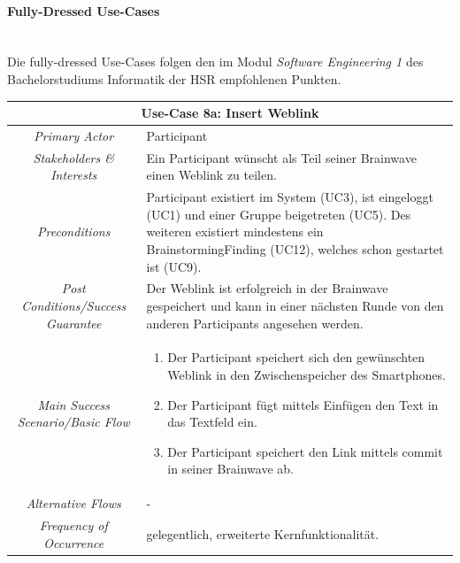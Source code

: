 \paragraph{Fully-Dressed Use-Cases}
\label{par:fully-dressed-uc}~\\
Die fully-dressed Use-Cases folgen den im Modul \textit{Software Engineering 1} des Bachelorstudiums Informatik der HSR empfohlenen Punkten.
\renewcommand{\arraystretch}{1.35}
\begin{center}
	\begin{longtable}{| c | p{7cm} |}
		\hline
		\multicolumn{2}{|c|}{\textbf{Use-Case 8a: Insert Weblink}}\\
		\hline\hline
		\textit{Primary Actor} & Participant\\
		\hline
		\textit{Stakeholders \& Interests} & Ein Participant wünscht als Teil seiner Brainwave einen Weblink zu teilen. \\
		\hline
		\textit{Preconditions} & Participant existiert im System (UC3), ist eingeloggt (UC1) und einer Gruppe beigetreten (UC5). Des weiteren existiert mindestens ein BrainstormingFinding (UC12), welches schon gestartet ist (UC9).\\
		\hline
		\textit{Post Conditions/Success Guarantee} & Der Weblink ist erfolgreich in der Brainwave gespeichert und kann in einer nächsten Runde von den anderen Participants angesehen werden.\\
		\hline
		\textit{Main Success Scenario/Basic Flow} & 
		\begin{enumerate}[noitemsep]
			\item Der Participant speichert sich den gewünschten Weblink in den Zwischenspeicher des Smartphones.
			\item Der Participant fügt mittels Einfügen den Text in das Textfeld ein.
			\item Der Participant speichert den Link mittels commit in seiner Brainwave ab.
		\end{enumerate}\\
		\hline
		\textit{Alternative Flows} &
		-\\
		\hline
		\textit{Frequency of Occurrence} & gelegentlich, erweiterte Kernfunktionalität.\\
		\hline
	\end{longtable}
\end{center}

